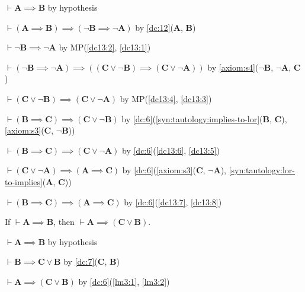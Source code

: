 \documentclass{amsart}%
\newcommand\metavariable[1]{\boldsymbol{#1}}
\begin{document}
\begin{pf}
\item\label{dc13:1} $\vdash\metavariable{A}\implies\metavariable{B}$ by hypothesis
\item\label{dc13:2} $\vdash(\metavariable{A}\implies\metavariable{B})\implies(\neg\metavariable{B}\implies\neg\metavariable{A})$
  by \ref{dc:12}($\metavariable{A}$, $\metavariable{B}$)
\item\label{dc13:3} $\vdash\neg\metavariable{B}\implies\neg\metavariable{A}$
  by MP(\ref{dc13:2}, \ref{dc13:1})
\item\label{dc13:4} $\vdash(\neg\metavariable{B}\implies\neg\metavariable{A})\implies((\metavariable{C}\lor\neg\metavariable{B})\implies(\metavariable{C}\lor\neg\metavariable{A}))$
  by \ref{axiom:s4}($\neg\metavariable{B}$, $\neg\metavariable{A}$, $\metavariable{C}$)
\item\label{dc13:5} $\vdash(\metavariable{C}\lor\neg\metavariable{B})\implies(\metavariable{C}\lor\neg\metavariable{A})$
  by MP(\ref{dc13:4}, \ref{dc13:3})
\item\label{dc13:6} $\vdash(\metavariable{B}\implies\metavariable{C})\implies(\metavariable{C}\lor\neg\metavariable{B})$
  by \ref{dc:6}(\ref{syn:tautology:implies-to-lor}($\metavariable{B}$, $\metavariable{C}$),
  \ref{axiom:s3}($\metavariable{C}$, $\neg\metavariable{B}$))
\item\label{dc13:7} $\vdash(\metavariable{B}\implies\metavariable{C})\implies(\metavariable{C}\lor\neg\metavariable{A})$
  by \ref{dc:6}(\ref{dc13:6}, \ref{dc13:5})
\item\label{dc13:8} $\vdash(\metavariable{C}\lor\neg\metavariable{A})\implies(\metavariable{A}\implies\metavariable{C})$
  by \ref{dc:6}(\ref{axiom:s3}($\metavariable{C}$, $\neg\metavariable{A}$),
  \ref{syn:tautology:lor-to-implies}($\metavariable{A}$, $\metavariable{C}$))
\item $\vdash(\metavariable{B}\implies\metavariable{C})\implies(\metavariable{A}\implies\metavariable{C})$
  by \ref{dc:6}(\ref{dc13:7}, \ref{dc13:8})
\end{pf}

\begin{lemma}\label{lem:prop:weakening-l}
If $\vdash\metavariable{A}\implies\metavariable{B}$, then
$\vdash\metavariable{A}\implies(\metavariable{C}\lor\metavariable{B})$.
\end{lemma}

\begin{pf}
\item\label{lm3:1} $\vdash\metavariable{A}\implies\metavariable{B}$ by hypothesis
\item\label{lm3:2} $\vdash\metavariable{B}\implies\metavariable{C}\lor\metavariable{B}$ 
  by \ref{dc:7}($\metavariable{C}$, $\metavariable{B}$)
\item $\vdash\metavariable{A}\implies(\metavariable{C}\lor\metavariable{B})$
  by \ref{dc:6}(\ref{lm3:1}, \ref{lm3:2})
\end{pf}
\end{document}
